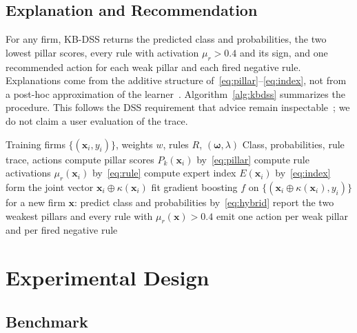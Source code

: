 \documentclass[10pt,journal,compsoc]{IEEEtran}
\begin{document}
\subsection{Explanation and Recommendation}

For any firm, KB-DSS returns the predicted class and probabilities, the two lowest pillar scores, every rule with activation \(\mu_r>0.4\) and its sign, and one recommended action for each weak pillar and each fired negative rule. Explanations come from the additive structure of~\eqref{eq:pillar}--\eqref{eq:index}, not from a post-hoc approximation of the learner~\cite{barredo2020,adadi2018}. Algorithm~\ref{alg:kbdss} summarizes the procedure. This follows the DSS requirement that advice remain inspectable~\cite{shim2002}; we do not claim a user evaluation of the trace.

\begin{algorithm}[t]
\caption{KB-DSS Readiness Prediction and Explanation}
\label{alg:kbdss}
\begin{algorithmic}[1]
\Require Training firms \(\{(\mathbf{x}_i,y_i)\}\), weights \(w\), rules \(R\), \((\boldsymbol{\omega},\lambda)\)
\Ensure Class, probabilities, rule trace, actions
    \State compute pillar scores \(P_k(\mathbf{x}_i)\) by~\eqref{eq:pillar}
    \State compute rule activations \(\mu_r(\mathbf{x}_i)\) by~\eqref{eq:rule}
    \State compute expert index \(E(\mathbf{x}_i)\) by~\eqref{eq:index}
    \State form the joint vector \(\mathbf{x}_i\oplus\kappa(\mathbf{x}_i)\)
\EndFor
\State fit gradient boosting \(f\) on \(\{(\mathbf{x}_i\oplus\kappa(\mathbf{x}_i),y_i)\}\)
\State for a new firm \(\mathbf{x}\): predict class and probabilities by~\eqref{eq:hybrid}
\State report the two weakest pillars and every rule with \(\mu_r(\mathbf{x})>0.4\)
\State emit one action per weak pillar and per fired negative rule
\end{algorithmic}
\end{algorithm}

\section{Experimental Design}

\subsection{Benchmark}
\end{document}

